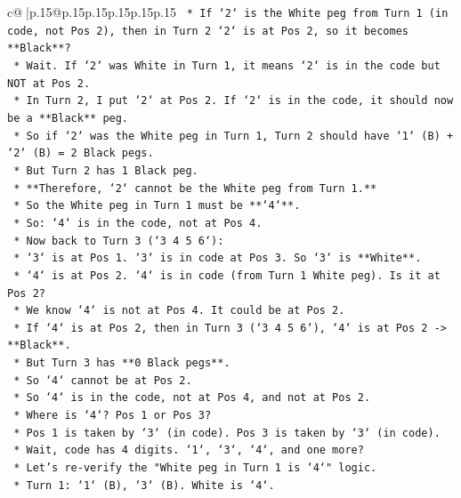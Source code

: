 \documentclass{article}
\begin{document}
{\begin{supertabular}{c@{$\;$}|p{.15\linewidth}@{}p{.15\linewidth}p{.15\linewidth}p{.15\linewidth}p{.15\linewidth}p{.15\linewidth}}
{{{\texttt{            *   If `2` is the White peg from Turn 1 (in code, not Pos 2), then in Turn 2 `2` is at Pos 2, so it becomes **Black**?} \\
\texttt{                *   Wait. If `2` was White in Turn 1, it means `2` is in the code but NOT at Pos 2.} \\
\texttt{                *   In Turn 2, I put `2` at Pos 2. If `2` is in the code, it should now be a **Black** peg.} \\
\texttt{                *   So if `2` was the White peg in Turn 1, Turn 2 should have `1` (B) + `2` (B) = 2 Black pegs.} \\
\texttt{                *   But Turn 2 has 1 Black peg.} \\
\texttt{                *   **Therefore, `2` cannot be the White peg from Turn 1.**} \\
\texttt{            *   So the White peg in Turn 1 must be **`4`**.} \\
\texttt{            *   So: `4` is in the code, not at Pos 4.} \\
\texttt{            *   Now back to Turn 3 (`3 4 5 6`):} \\
\texttt{                *   `3` is at Pos 1. `3` is in code at Pos 3. So `3` is **White**.} \\
\texttt{                *   `4` is at Pos 2. `4` is in code (from Turn 1 White peg). Is it at Pos 2?} \\
\texttt{                *   We know `4` is not at Pos 4. It could be at Pos 2.} \\
\texttt{                *   If `4` is at Pos 2, then in Turn 3 (`3 4 5 6`), `4` is at Pos 2 {-}> **Black**.} \\
\texttt{                *   But Turn 3 has **0 Black pegs**.} \\
\texttt{                *   So `4` cannot be at Pos 2.} \\
\texttt{                *   So `4` is in the code, not at Pos 4, and not at Pos 2.} \\
\texttt{                *   Where is `4`? Pos 1 or Pos 3?} \\
\texttt{                *   Pos 1 is taken by `3` (in code). Pos 3 is taken by `3` (in code).} \\
\texttt{                *   Wait, code has 4 digits. `1`, `3`, `4`, and one more?} \\
\texttt{                *   Let's re{-}verify the "White peg in Turn 1 is `4`" logic.} \\
\texttt{                *   Turn 1: `1` (B), `3` (B). White is `4`.} \\
}}}
\end{supertabular}}
\end{document}
